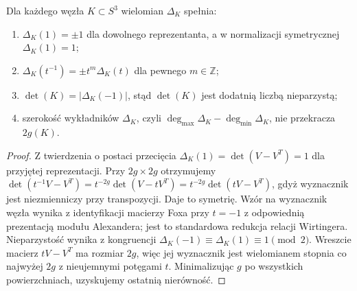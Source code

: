 \begin{stwierdzenie}
Dla każdego węzła $K\subset S^3$ wielomian $\Delta_K$ spełnia:
\begin{enumerate}[label=(\roman*)]
\item $\Delta_K(1)=\pm1$ dla dowolnego reprezentanta, a w normalizacji
symetrycznej $\Delta_K(1)=1$;
\item $\Delta_K(t^{-1})=\pm t^m\Delta_K(t)$ dla pewnego $m\in\mathbb Z$;
\item $\det(K)=|\Delta_K(-1)|$, stąd $\det(K)$ jest dodatnią liczbą nieparzystą;
\item szerokość wykładników $\Delta_K$, czyli
$\deg_{\max}\Delta_K-\deg_{\min}\Delta_K$, nie przekracza $2g(K)$.
\end{enumerate}
\end{stwierdzenie}

\begin{proof}
Z twierdzenia o postaci przecięcia
$\Delta_K(1)=\det(V-V^T)=1$ dla przyjętej reprezentacji.
Przy $2g\times2g$ otrzymujemy
$\det(t^{-1}V-V^T)=t^{-2g}\det(V-tV^T)
=t^{-2g}\det(tV-V^T)$, gdyż wyznacznik jest niezmienniczy
przy transpozycji. Daje to symetrię. Wzór na wyznacznik
węzła wynika z identyfikacji macierzy Foxa przy $t=-1$
z odpowiednią prezentacją modułu Alexandera; jest to standardowa
redukcja relacji Wirtingera. Nieparzystość wynika z kongruencji
$\Delta_K(-1)\equiv\Delta_K(1)\equiv1\pmod2$.
Wreszcie macierz $tV-V^T$ ma rozmiar $2g$, więc jej
wyznacznik jest wielomianem stopnia co najwyżej $2g$
z nieujemnymi potęgami $t$. Minimalizując $g$ po wszystkich
powierzchniach, uzyskujemy ostatnią nierówność.
\end{proof}

